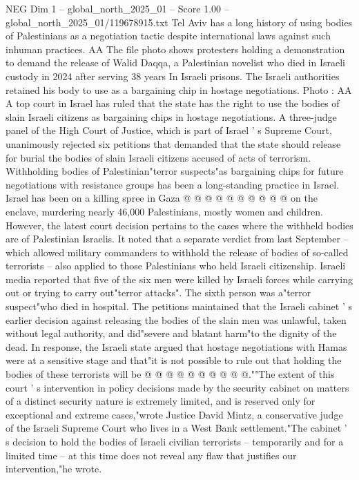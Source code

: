 \begin{textsample}{NEG Dim 1 – global\_north\_2025\_01 – Score 1.00 – global\_north\_2025\_01/119678915.txt}  \label{ex:f1_neg_059}
Tel Aviv has a long history of using bodies of Palestinians as a negotiation tactic despite international laws against such inhuman practices.
AA The file photo shows protesters holding a demonstration to demand the release of Walid Daqqa, a Palestinian novelist who died in Israeli custody in 2024 after serving 38 years In Israeli prisons.
The Israeli authorities retained his body to use as a bargaining chip in hostage negotiations.
Photo : AA A top court in Israel has ruled that the state has the right to use the bodies of slain Israeli citizens as bargaining chips in hostage negotiations.
A three-judge panel of the High Court of Justice, which is part of Israel ' s Supreme Court, unanimously rejected six petitions that demanded that the state should release for burial the bodies of slain Israeli citizens accused of acts of terrorism.
Withholding bodies of Palestinian"terror suspects"as bargaining chips for future negotiations with resistance groups has been a long-standing practice in Israel.
Israel has been on a killing spree in Gaza @ @ @ @ @ @ @ @ @ @ on the enclave, murdering nearly 46,000 Palestinians, mostly women and children.
However, the latest court decision pertains to the cases where the withheld bodies are of Palestinian Israelis.
It noted that a separate verdict from last September -- which allowed military commanders to withhold the release of bodies of so-called terrorists -- also applied to those Palestinians who held Israeli citizenship.
Israeli media reported that five of the six men were killed by Israeli forces while carrying out or trying to carry out"terror attacks".
The sixth person was a"terror suspect"who died in hospital.
The petitions maintained that the Israeli cabinet ' s earlier decision against releasing the bodies of the slain men was unlawful, taken without legal authority, and did"severe and blatant harm"to the dignity of the dead.
In response, the Israeli state argued that hostage negotiations with Hamas were at a sensitive stage and that"it is not possible to rule out that holding the bodies of these terrorists will be @ @ @ @ @ @ @ @ @ @.""The extent of this court ' s intervention in policy decisions made by the security cabinet on matters of a distinct security nature is extremely limited, and is reserved only for exceptional and extreme cases,"wrote Justice David Mintz, a conservative judge of the Israeli Supreme Court who lives in a West Bank settlement."The cabinet ' s decision to hold the bodies of Israeli civilian terrorists -- temporarily and for a limited time -- at this time does not reveal any flaw that justifies our intervention,"he wrote.

\end{textsample}
